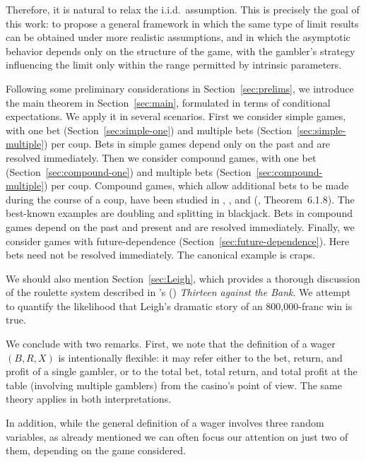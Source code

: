 \documentclass{article}
\theoremstyle{definition}
\theoremstyle{remark}
\begin{document}
Therefore, it is natural to relax the i.i.d.\ assumption.  This is precisely the goal of this work: to propose a general framework in which the same type of limit results can be obtained under more realistic assumptions, and in which the asymptotic behavior depends only on the structure of the game, with the gambler’s strategy influencing the limit only within the range permitted by intrinsic parameters.

Following some preliminary considerations in Section~\ref{sec:prelims}, we introduce the main theorem in Section~\ref{sec:main}, formulated in terms of conditional expectations.  We apply it in several scenarios.  First we consider simple games, with one bet (Section~\ref{sec:simple-one}) and multiple bets (Section~\ref{sec:simple-multiple}) per coup.  Bets in simple games depend only on the past and are resolved immediately.  Then we consider compound games, with one bet (Section~\ref{sec:compound-one}) and multiple bets (Section~\ref{sec:compound-multiple}) per coup.  Compound games, which allow additional bets to be made during the course of a coup, have been studied in \cite{D69}, \cite{Ca00}, and \citeauthor{E10} (\citeyear{E10}, Theorem~6.1.8).  The best-known examples are doubling and splitting in blackjack.  Bets in compound games depend on the past and present and are resolved immediately.  Finally, we consider games with future-dependence (Section~\ref{sec:future-dependence}).  Here bets need not be resolved immediately. The canonical example is craps.

We should also mention Section~\ref{sec:Leigh}, which provides a thorough discussion of the roulette system described in \citeauthor{L76}'s (\citeyear{L76}) \textit{Thirteen against the Bank}.  We attempt to quantify the likelihood that Leigh's dramatic story of an 800,000-franc win is true.

We conclude with two remarks.  First, we note that the definition of a wager $(B,R,X)$ is intentionally flexible: it may refer either to the bet, return, and profit of a single gambler, or to the total bet, total return, and total profit at the table (involving multiple gamblers) from the casino’s point of view.  The same theory applies in both interpretations.

In addition, while the general definition of a wager involves three random variables, as already mentioned we can often focus our attention on just two of them, depending on the game considered.  
\end{document}
